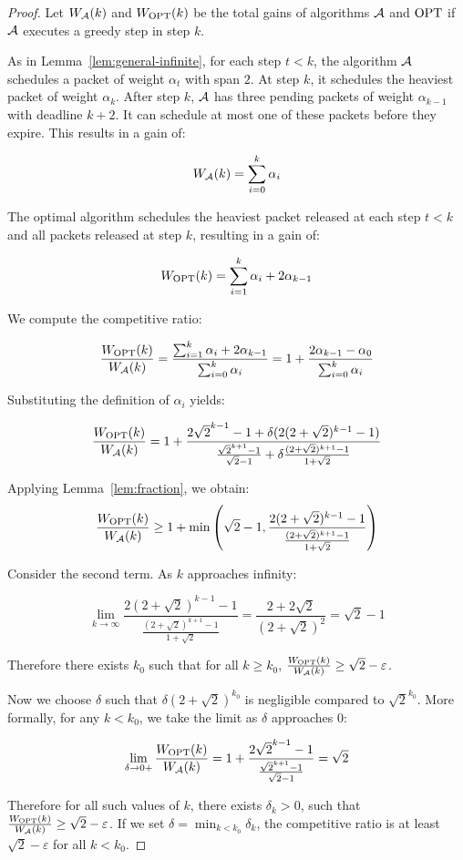 \begin{proof}
Let $W_{\mathcal{A}}(k)$ and $W_{\text{OPT}}(k)$ be the total gains of algorithms $\mathcal{A}$ and $\text{OPT}$
if $\mathcal{A}$ executes a greedy step in step $k$.

As in Lemma~\ref{lem:general-infinite}, for each step $t < k$, the algorithm $\mathcal{A}$
schedules a packet of weight $\alpha_t$ with span $2$. At step $k$, it schedules
the heaviest packet of weight $\alpha_k$. After step $k$, $\mathcal{A}$ has three pending
packets of weight $\alpha_{k-1}$ with deadline $k + 2$. It can schedule at
most one of these packets before they expire. This results in a gain of:

$$
W_{\mathcal{A}}(k) = \sum_{i=0}^{k} \alpha_i
$$

The optimal algorithm schedules the heaviest packet released at each step $t < k$
and all packets released at step $k$, resulting in a gain of:

$$
W_{\text{OPT}}(k) = \sum_{i=1}^k \alpha_i + 2\alpha_{k-1}
$$

We compute the competitive ratio:

$$
\frac{W_{\text{OPT}}(k)}{W_{\mathcal{A}}(k)} = \frac{\sum_{i=1}^k \alpha_i + 2\alpha_{k-1}}{\sum_{i=0}^{k} \alpha_i} =
1 + \frac{2\alpha_{k-1} - \alpha_0}{\sum_{i=0}^{k} \alpha_i}
$$

Substituting the definition of $\alpha_i$ yields:

$$
\frac{W_{\text{OPT}}(k)}{W_{\mathcal{A}}(k)} =
1 + \frac{2 \sqrt{2}^{k-1} - 1 + \delta (2 (2 + \sqrt{2})^{k-1} - 1)}
{\frac{\sqrt{2}^{k+1} - 1}{\sqrt{2} - 1} + \delta \frac{(2 +
\sqrt{2})^{k+1} - 1}{1 + \sqrt{2}}}
$$

Applying Lemma~\ref{lem:fraction}, we obtain:
$$
\frac{W_{\text{OPT}}(k)}{W_{\mathcal{A}}(k)} \geq 1 + \min\left(\sqrt{2} - 1, \frac{2 (2 + \sqrt{2})^{k-1} - 1}{\frac{(2+\sqrt{2})^{k+1} - 1}{1 + \sqrt{2}}}\right)
$$

Consider the second term. As $k$ approaches infinity:

$$
\lim_{k \to \infty} \frac{2 (2 + \sqrt{2})^{k-1} - 1}{\frac{(2+\sqrt{2})^{k+1} - 1}{1 + \sqrt{2}}}
= \frac{2 + 2\sqrt{2}}{(2 + \sqrt{2})^2} = \sqrt{2} - 1
$$

Therefore there exists $k_0$ such that for all $k \geq k_0$,
$\frac{W_{\text{OPT}}(k)}{W_{\mathcal{A}}(k)} \geq \sqrt{2} - \varepsilon$.

Now we choose $\delta$ such that $\delta (2 + \sqrt{2})^{k_0}$ is negligible
compared to $\sqrt{2}^{k_0}$. More formally, for any $k < k_0$, we take the
limit as $\delta$ approaches $0$:

$$
\lim_{\delta \to 0+} \frac{W_{\text{OPT}}(k)}{W_{\mathcal{A}}(k)} =
1 + \frac{2\sqrt{2}^{k-1} - 1}{\frac{\sqrt{2}^{k+1} - 1}{\sqrt{2} - 1}}
= \sqrt{2}
$$

Therefore for all such values of $k$, there exists $\delta_k > 0$, such that
$\frac{W_{\text{OPT}}(k)}{W_{\mathcal{A}}(k)} \geq \sqrt{2} - \varepsilon$. If we set $\delta =
\min_{k < k_0} \delta_k$, the competitive ratio is at least $\sqrt{2} -
\varepsilon$ for all $k < k_0$.
\end{proof}


